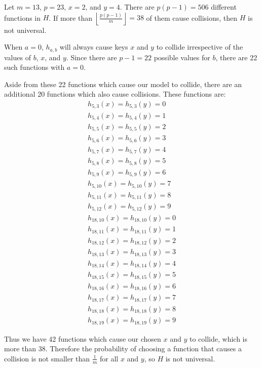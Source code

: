 \documentclass[fleqn]{article}
\newenvironment{answers}{ %
	\begin{enumerate}
		\setlength{\itemsep}{\bigskipamount}
}{\end{enumerate}}
\begin{document}
\begin{answers}
	Let \(m=13\), \(p=23\), \(x=2\), and \(y=4\). There are \(p(p-1) = 506\) different functions in \(H\). If more than \(\left\lfloor \frac{p(p-1)}{m} \right\rfloor = 38\) of them cause collisions, then \(H\) is not universal.

	When \(a=0\), \(h_{a,b}\) will always cause keys \(x\) and \(y\) to collide irrespective of the values of \(b\), \(x\), and \(y\). Since there are \(p-1=22\) possible values for \(b\), there are 22 such functions with \(a=0\).

	Aside from these 22 functions which cause our model to collide, there are an additional 20 functions which also cause collisions. These functions are:
	\begin{gather*}
		h_{5,3}(x) = h_{5,3}(y) = 0 \\
		h_{5,4}(x) = h_{5,4}(y) = 1 \\
		h_{5,5}(x) = h_{5,5}(y) = 2 \\
		h_{5,6}(x) = h_{5,6}(y) = 3 \\
		h_{5,7}(x) = h_{5,7}(y) = 4 \\
		h_{5,8}(x) = h_{5,8}(y) = 5 \\
		h_{5,9}(x) = h_{5,9}(y) = 6 \\
		h_{5,10}(x) = h_{5,10}(y) = 7 \\
		h_{5,11}(x) = h_{5,11}(y) = 8 \\
		h_{5,12}(x) = h_{5,12}(y) = 9 \\
		h_{18,10}(x) = h_{18,10}(y) = 0 \\
		h_{18,11}(x) = h_{18,11}(y) = 1 \\
		h_{18,12}(x) = h_{18,12}(y) = 2 \\
		h_{18,13}(x) = h_{18,13}(y) = 3 \\
		h_{18,14}(x) = h_{18,14}(y) = 4 \\
		h_{18,15}(x) = h_{18,15}(y) = 5 \\
		h_{18,16}(x) = h_{18,16}(y) = 6 \\
		h_{18,17}(x) = h_{18,17}(y) = 7 \\
		h_{18,18}(x) = h_{18,18}(y) = 8 \\
		h_{18,19}(x) = h_{18,19}(y) = 9
	\end{gather*}

	Thus we have 42 functions which cause our chosen \(x\) and \(y\) to collide, which is more than 38. Therefore the probability of choosing a function that causes a collision is not smaller than \(\frac{1}{m}\) for all \(x\) and \(y\), so \(H\) is not universal.

\end{answers}
\end{document}
